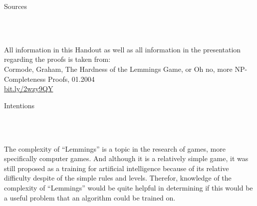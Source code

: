 \documentclass[a5paper, 8pt]{scrartcl} %
\begin{document}
\vspace*{0.5cm}
\begin{Large}
Sources
\end{Large}\\\vspace*{-0.25cm}
\hrulefill\\\vspace*{0.3cm}
\begin{minipage}{0.93\textwidth}
All information in this Handout as well as all information in the presentation regarding the proofs is taken from:\\
Cormode, Graham, The Hardness of the Lemmings Game, or
Oh no, more NP-Completeness Proofs, 01.2004\\
\url{bit.ly/2wzy9QY}
\end{minipage}
\newpage

\maketitle
\center

\begin{Large}
Intentions
\end{Large}\\\vspace*{-0.25cm}
\hrulefill\\\vspace*{0.3cm}
\begin{minipage}{0.93\textwidth}
The complexity of ``Lemmings'' is a topic in the research of games, more specifically computer games. And although it is a relatively simple game, it was still proposed as a training for artificial intelligence because of its relative difficulty despite of the simple rules and levels. Therefor, knowledge of the complexity of ``Lemmings'' would be quite helpful in determining if this would be a useful problem that an algorithm could be trained on.
\end{minipage}
\end{document}
